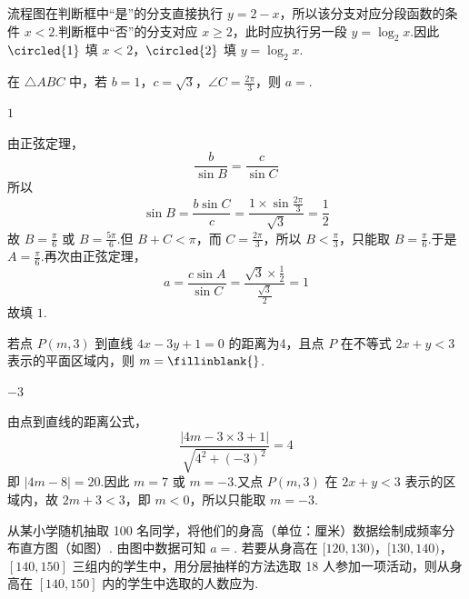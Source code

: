 \begin{solution}
流程图在判断框中“是”的分支直接执行 \(y=2-x\)，所以该分支对应分段函数的条件 \(x<2\).判断框中“否”的分支对应 \(x\geqslant2\)，此时应执行另一段 \(y=\log_{2}x\).因此 \(\circled{1}\) 填 \(x<2\)，\(\circled{2}\) 填 \(y=\log_{2}x\).
\end{solution}

\begin{problem}
在 \(\triangle ABC\) 中，若 \(b = 1\)，\(c = \sqrt{3}\)，\(\angle C = \frac{2\pi}{3}\)，则 \(a = \)\fillinblank{}.
\end{problem}

\begin{answer}
\(1\)
\end{answer}

\begin{solution}
由正弦定理，
\[
\frac{b}{\sin B}=\frac{c}{\sin C}
\]
所以
\[
\sin B=\frac{b\sin C}{c}=\frac{1\times\sin\frac{2\pi}{3}}{\sqrt{3}}=\frac{1}{2}
\]
故 \(B=\frac{\pi}{6}\) 或 \(B=\frac{5\pi}{6}\).但 \(B+C<\pi\)，而 \(C=\frac{2\pi}{3}\)，所以 \(B<\frac{\pi}{3}\)，只能取 \(B=\frac{\pi}{6}\).于是 \(A=\frac{\pi}{6}\).再次由正弦定理，
\[
a=\frac{c\sin A}{\sin C}=\frac{\sqrt{3}\times\frac{1}{2}}{\frac{\sqrt{3}}{2}}=1
\]
故填 \(1\).
\end{solution}

\begin{problem}
若点 \(P(m,3)\) 到直线 \(4x - 3y + 1 = 0\) 的距离为4，且点 \(P\) 在不等式 \(2x + y < 3\) 表示的平面区域内，则 \(m =\fillinblank{}\).
\end{problem}

\begin{answer}
\(-3\)
\end{answer}

\begin{solution}
由点到直线的距离公式，
\[
\frac{|4m-3\times3+1|}{\sqrt{4^2+(-3)^2}}=4
\]
即 \(|4m-8|=20\).因此 \(m=7\) 或 \(m=-3\).又点 \(P(m,3)\) 在 \(2x+y<3\) 表示的区域内，故 \(2m+3<3\)，即 \(m<0\)，所以只能取 \(m=-3\).
\end{solution}

\begin{problem}
从某小学随机抽取 100 名同学，将他们的身高（单位：厘米）数据绘制成频率分布直方图（如图）.
由图中数据可知 \(a =\)\fillinblank{}. 若要从身高在 \([120, 130)\)，\([130, 140)\)，\([140, 150]\) 三组内的学生中，用分层抽样的方法选取 18 人参加一项活动，则从身高在 \([140, 150]\) 内的学生中选取的人数应为\fillinblank{}.
\end{problem}

